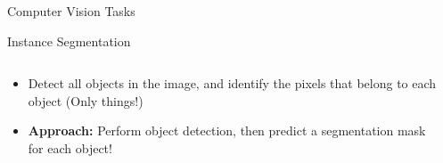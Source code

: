 \documentclass[10pt]{beamer}
\theoremstyle{remark}
\theoremstyle{definition}
\begin{document}
\begin{frame}{Computer Vision Tasks}
\end{frame}

\begin{frame}{Instance Segmentation}
    \begin{columns}
    \begin{column}{0.5\textwidth}
        \begin{itemize}
            \item<1-> Detect all objects in the image, and identify the pixels that belong to each object (Only things!)
            \item<2-> \textbf{Approach:} Perform object detection, then predict a segmentation mask for each object!
        \end{itemize}
    \end{column}
    \begin{column}{0.5\textwidth}
    \end{column}
\end{columns}
\end{frame}
\end{document}
